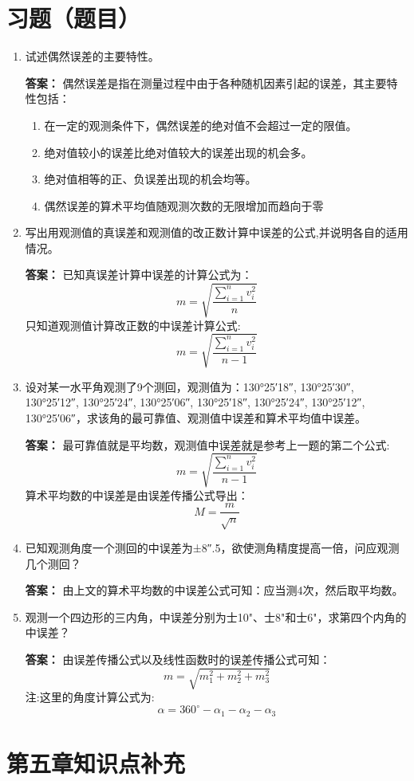\documentclass[12pt,a4paper]{article}
\newcounter{question}
\newenvironment{questions}{
    \setcounter{question}{0}
    \section*{习题（题目）}
    \begin{enumerate}[leftmargin=1.5em,label={\arabic*．}]
}{
    \end{enumerate}
}
\newcommand{\answer}[1]{\par\noindent\textbf{答案：} #1\par\vspace{1em}}
\begin{document}
\begin{questions}
    \item 试述偶然误差的主要特性。
    
    \answer{偶然误差是指在测量过程中由于各种随机因素引起的误差，其主要特性包括：
        \begin{enumerate}
\item 在一定的观测条件下，偶然误差的绝对值不会超过一定的限值。

\item 绝对值较小的误差比绝对值较大的误差出现的机会多。

\item 绝对值相等的正、负误差出现的机会均等。

\item 偶然误差的算术平均值随观测次数的无限增加而趋向于零
    \end{enumerate}}


    

    \item 写出用观测值的真误差和观测值的改正数计算中误差的公式,并说明各自的适用情况。
    \answer{已知真误差计算中误差的计算公式为：
    $$m = \sqrt{\frac{\sum_{i=1}^{n} v_i^2}{n}}$$
    只知道观测值计算改正数的中误差计算公式:
    $$m = \sqrt{\frac{\sum_{i=1}^{n} v_i^2}{n - 1}}$$
    }

    \item 设对某一水平角观测了9个测回，观测值为：130°25′18″, 130°25′30″, 130°25′12″, 130°25′24″, 130°25′06″, 130°25′18″, 130°25′24″, 130°25′12″, 130°25′06″，求该角的最可靠值、观测值中误差和算术平均值中误差。
    \answer{最可靠值就是平均数，观测值中误差就是参考上一题的第二个公式:
    $$m = \sqrt{\frac{\sum_{i=1}^{n} v_i^2}{n - 1}}$$
    算术平均数的中误差是由误差传播公式导出：
    $$M = \frac{m}{\sqrt{n}}$$
    }
    \item 已知观测角度一个测回的中误差为±8″.5，欲使测角精度提高一倍，问应观测几个测回？
    \answer{由上文的算术平均数的中误差公式可知：应当测4次，然后取平均数。}

    \item 观测一个四边形的三内角，中误差分别为士10"、士8"和士6"，求第四个内角的中误差？
    \answer{由误差传播公式以及线性函数时的误差传播公式可知：
    $$m = \sqrt{m_1^2 + m_2^2 + m_3^2}$$
    注:这里的角度计算公式为:$$\alpha = 360^\circ - \alpha_1 - \alpha_2 - \alpha_3$$
    }
\end{questions}

\section*{第五章\quad 知识点补充}
\end{document}

